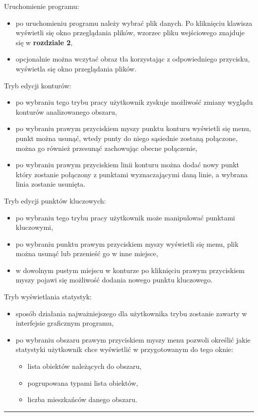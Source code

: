 \documentclass[a4paper,11pt]{article}
\newcommand{\linia}{\rule{\linewidth}{0.4mm}}
\begin{document}
\noindent
Uruchomienie programu:
\begin{itemize}
\item po uruchomieniu programu należy wybrać plik danych. Po kliknięciu klawisza wyświetli się okno przeglądania plików, wzorzec pliku wejściowego znajduje się w \textbf{rozdziale 2},
\item opcjonalnie można wczytać obraz tła korzystając z odpowiedniego przycisku, wyświetla się okno przeglądania plików.
\end{itemize}
Tryb edycji konturów:
\begin{itemize}
\item po wybraniu tego trybu pracy użytkownik zyskuje możliwość zmiany wyglądu konturów analizowanego obszaru,
\item po wybraniu prawym przyciskiem myszy punktu konturu wyświetli się menu, punkt można usunąć, wtedy punty do niego sąsiednie zostaną połączone, można go również przesunąć zachowując obecne połączenie,
\item po wybraniu prawym przyciskiem linii konturu można dodać nowy punkt który zostanie połączony z punktami wyznaczającymi daną linie, a wybrana linia zostanie usunięta.
\end{itemize}
Tryb edycji punktów kluczowych:
\begin{itemize}
\item po wybraniu tego trybu pracy użytkownik może manipulować punktami kluczowymi,
\item po wybraniu punktu prawym przyciskiem myszy wyświetli się menu, plik można usunąć lub przenieść go w inne miejsce,
\item w dowolnym pustym miejscu w konturze po kliknięciu prawym przyciskiem myszy pojawi się możliwość dodania nowego punktu kluczowego.
\end{itemize}
\pagebreak
Tryb wyświetlania statystyk:
\begin{itemize}
\item sposób działania najważniejszego dla użytkownika trybu zostanie zawarty w interfejsie graficznym programu,
\item po wybraniu obszaru prawym przyciskiem myszy menu pozwoli określić jakie statystyki użytkownik chce wyświetlić w przygotowanym do tego oknie:
\begin{itemize}
\item lista obiektów należących do obszaru,
\item pogrupowana typami lista obiektów,
\item liczba mieszkańców danego obszaru.
\end{itemize}
\end{itemize}
\noindent\linia
\end{document}
